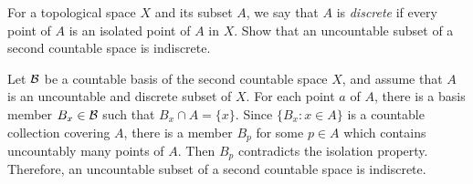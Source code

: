 \begin{prob}
    For a topological space $X$ and its subset $A$, we say that $A$ is \textit{discrete} if every point of $A$ is an isolated point of $A$ in $X$.
    Show that an uncountable subset of a second countable space is indiscrete.
\end{prob}
\begin{sol}
    Let ${\mathcal{B}}$ be a countable basis of the second countable space $X$, and assume that $A$ is an uncountable and discrete subset of $X$.
    For each point $a$ of $A$, there is a basis member $B_x\in{\mathcal{B}}$ such that $B_x\cap A=\{x\}$.
    Since $\{B_x: x\in A\}$ is a countable collection covering $A$, there is a member $B_p$ for some $p\in A$ which contains uncountably many points of $A$.
    Then $B_p$ contradicts the isolation property.
    Therefore, an uncountable subset of a second countable space is indiscrete.
\end{sol}